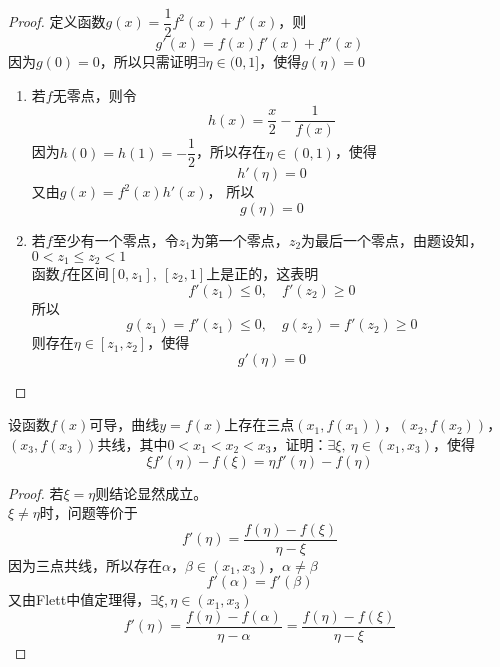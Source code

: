 \begin{proof}

    定义函数$g(x) = \dfrac{1}{2}f^2(x) + f'(x)$，则
    $$g'(x) = f(x) f'(x) + f''(x)$$
    因为$g(0) = 0$，所以只需证明$\exists \eta \in (0,1]$，使得$g(\eta) = 0$

    \begin{enumerate}

        \item 
            若$f$无零点，则令
            $$h(x) = \dfrac{x}{2} - \dfrac{1}{f(x)}$$
            因为$h(0) = h(1) = -\dfrac{1}{2}$，所以存在$\eta \in (0,1)$，使得
            $$h'(\eta) = 0$$
            又由$g(x) = f^2(x) h'(x)$，
            所以
            $$g(\eta) = 0$$

        \item 
            若$f$至少有一个零点，令$z_1$为第一个零点，$z_2$为最后一个零点，由题设知，$0 < z_1 \leq z_2 < 1$ \\
            函数$f$在区间$[0,z_1],\ [z_2,1]$上是正的，这表明
            $$f'(z_1) \leq 0,\quad f'(z_2) \geq 0$$
            所以
            $$g(z_1) = f'(z_1) \leq 0, \quad g(z_2) = f'(z_2) \geq 0$$
            则存在$\eta \in [z_1, z_2]$，使得
            $$g'(\eta) = 0$$

    \end{enumerate}

\end{proof}

\begin{proposition}

    设函数$f(x)$可导，曲线$y = f(x)$上存在三点$(x_1, f(x_1))$，$(x_2, f(x_2))$，$(x_3, f(x_3))$共线，其中$0 < x_1 < x_2 < x_3$，证明：$\exists \xi,\  \eta \in (x_1,x_3)$，使得
    $$\xi f'(\eta) - f(\xi) = \eta f'(\eta) - f(\eta)$$

\end{proposition}

\begin{proof}

    若$\xi = \eta$则结论显然成立。\\
    $\xi \neq \eta$时，问题等价于
    $$ f'(\eta) = \dfrac{f(\eta) - f(\xi)}{\eta - \xi}$$
    因为三点共线，所以存在$\alpha$，$\beta \in (x_1, x_3)$，$\alpha \neq \beta$
    $$f'(\alpha) = f'(\beta)$$
    又由\textup{Flett}中值定理得，$\exists \xi,\eta \in (x_1,x_3)$
    $$f'(\eta) = \dfrac{f(\eta) - f(\alpha)}{\eta - \alpha} = \dfrac{f(\eta) - f(\xi)}{\eta - \xi}$$

\end{proof}



